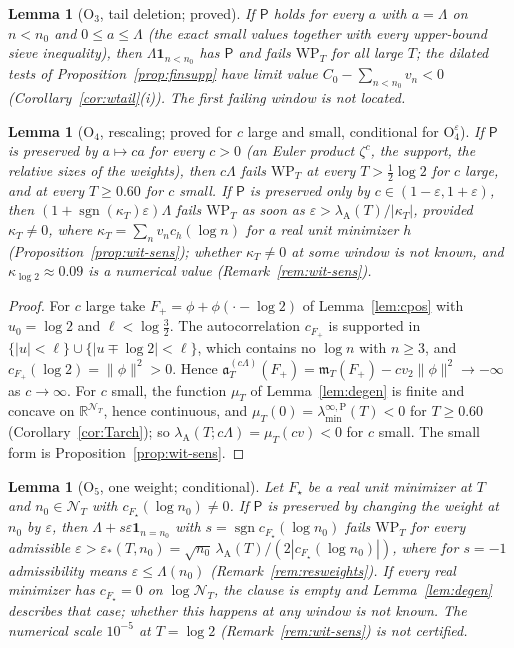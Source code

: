 \documentclass[11pt]{amsart}
\newtheorem{lemma}[theorem]{Lemma}
\theoremstyle{definition}
\theoremstyle{remark}
\newcommand{\R}{\mathbb R}
\newcommand{\lamA}{\lambda_{\mathrm A}(T)}
\newcommand{\NT}{\mathcal N_T}
\newcommand{\mT}{\mathfrak m_T}
\newcommand{\laminfP}{\lambda^{\infty,\mathrm P}_{\min}}
\begin{document}
\begin{lemma}[$\mathrm O_3$, tail deletion; proved]\label{lem:shape-tail}
If $\mathsf P$ holds for every $a$ with $a=\Lambda$ on $n<n_0$ and $0\le a\le\Lambda$ (the exact small values together with every upper-bound
sieve inequality), then $\Lambda\mathbf 1_{n<n_0}$ has $\mathsf P$ and fails $\mathrm{WP}_T$ for all large $T$; the dilated tests of
Proposition~\ref{prop:finsupp} have limit value $C_0-\sum_{n<n_0}v_n<0$ (Corollary~\ref{cor:wtail}(i)). The first failing window is not located.
\end{lemma}

\begin{lemma}[$\mathrm O_4$, rescaling; proved for $c$ large and small, conditional for $\mathrm O_4^\varepsilon$]\label{lem:shape-scale}
If $\mathsf P$ is preserved by $a\mapsto ca$ for every $c>0$ (an Euler product $\zeta^c$, the support, the relative sizes of the weights),
then $c\Lambda$ fails $\mathrm{WP}_T$ at every $T>\frac12\log2$ for $c$ large, and at every $T\ge0.60$ for $c$ small. If $\mathsf P$ is
preserved only by $c\in(1-\varepsilon,1+\varepsilon)$, then $(1+\operatorname{sgn}(\kappa_T)\varepsilon)\Lambda$ fails $\mathrm{WP}_T$ as soon as
$\varepsilon>\lamA/|\kappa_T|$, \emph{provided} $\kappa_T\ne0$, where $\kappa_T=\sum_nv_nc_h(\log n)$ for a real unit minimizer $h$
(Proposition~\ref{prop:wit-sens}); whether $\kappa_T\ne0$ at some window is not known, and $\kappa_{\log2}\approx0.09$ is a numerical value
(Remark~\ref{rem:wit-sens}).
\end{lemma}
\begin{proof}
For $c$ large take $F_+=\phi+\phi(\cdot-\log2)$ of Lemma~\ref{lem:cpos} with $u_0=\log2$ and $\ell<\log\frac32$. The autocorrelation
$c_{F_+}$ is supported in $\{|u|<\ell\}\cup\{|u\mp\log2|<\ell\}$, which contains no $\log n$ with $n\ge3$, and $c_{F_+}(\log2)=\|\phi\|^2>0$.
Hence $\mathfrak a^{(c\Lambda)}_T(F_+)=\mT(F_+)-cv_2\|\phi\|^2\to-\infty$ as $c\to\infty$. For $c$ small, the function $\mu_T$ of
Lemma~\ref{lem:degen} is finite and concave on $\R^{\NT}$, hence continuous, and $\mu_T(0)=\laminfP(T)<0$ for $T\ge0.60$
(Corollary~\ref{cor:Tarch}); so $\lambda_{\mathrm A}(T;c\Lambda)=\mu_T(cv)<0$ for $c$ small. The small form is Proposition~\ref{prop:wit-sens}.
\end{proof}

\begin{lemma}[$\mathrm O_5$, one weight; conditional]\label{lem:shape-weight}
Let $F_\star$ be a real unit minimizer at $T$ and $n_0\in\NT$ with $c_{F_\star}(\log n_0)\ne0$. If $\mathsf P$ is preserved by changing the
weight at $n_0$ by $\varepsilon$, then $\Lambda+s\varepsilon\mathbf 1_{n=n_0}$ with $s=\operatorname{sgn}c_{F_\star}(\log n_0)$ fails $\mathrm{WP}_T$
for every admissible $\varepsilon>\varepsilon_*(T,n_0)=\sqrt{n_0}\,\lamA/(2|c_{F_\star}(\log n_0)|)$, where for $s=-1$ admissibility means
$\varepsilon\le\Lambda(n_0)$ (Remark~\ref{rem:resweights}). If every real minimizer has $c_{F_\star}=0$ on $\log\NT$, the clause is empty
and Lemma~\ref{lem:degen} describes that case; whether this happens at any window is not known. The numerical scale $10^{-5}$ at $T=\log2$
(Remark~\ref{rem:wit-sens}) is not certified.
\end{lemma}
\end{document}
